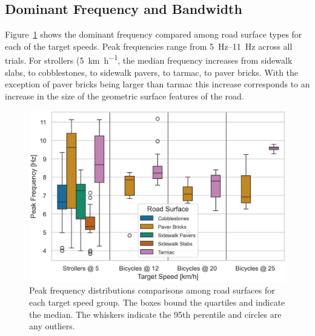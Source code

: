 \documentclass[a4paper]{article}
\begin{document}
\subsection{Dominant Frequency and Bandwidth}
%
Figure~\ref{fig:peak-freq-dist} shows the dominant frequency compared among road
surface types for each of the target speeds. Peak frequencies range from
\SIrange{5}{11}{\hertz} across all trials. For strollers
(5~\si{\kilo\meter\per\hour}, the median frequency increases from sidewalk
slabs, to cobblestones, to sidewalk pavers, to tarmac, to paver bricks. With the
exception of paver bricks being larger than tarmac this increase corresponds to
an increase in the size of the geometric surface features of the road.
%
\begin{figure}
  \centering
  \includegraphics[width=160mm]{fig/SeatBotacc_ver-peak-freq-dist.png}
  \caption{Peak frequency distributions comparisons among road surfaces for each
  target speed group. The boxes bound the quartiles and indicate the median. The
  whiskers indicate the 95th perentile and circles are any outliers.}
  \label{fig:peak-freq-dist}
\end{figure}
\end{document}
